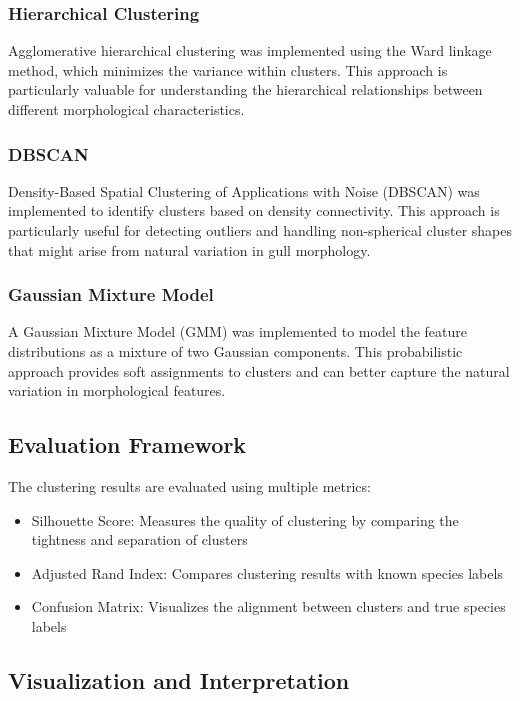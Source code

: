 \documentclass[a4paper,12pt]{report}
\begin{document}
\subsubsection{Hierarchical Clustering}
Agglomerative hierarchical clustering was implemented using the Ward linkage method, which minimizes the variance within clusters. This approach is particularly valuable for understanding the hierarchical relationships between different morphological characteristics.

\subsubsection{DBSCAN}
Density-Based Spatial Clustering of Applications with Noise (DBSCAN) was implemented to identify clusters based on density connectivity. This approach is particularly useful for detecting outliers and handling non-spherical cluster shapes that might arise from natural variation in gull morphology.

\subsubsection{Gaussian Mixture Model}
A Gaussian Mixture Model (GMM) was implemented to model the feature distributions as a mixture of two Gaussian components. This probabilistic approach provides soft assignments to clusters and can better capture the natural variation in morphological features.

\subsection{Evaluation Framework}

The clustering results are evaluated using multiple metrics:
\begin{itemize}
    \item Silhouette Score: Measures the quality of clustering by comparing the tightness and separation of clusters
    \item Adjusted Rand Index: Compares clustering results with known species labels
    \item Confusion Matrix: Visualizes the alignment between clusters and true species labels
\end{itemize}

\subsection{Visualization and Interpretation}
\end{document}
